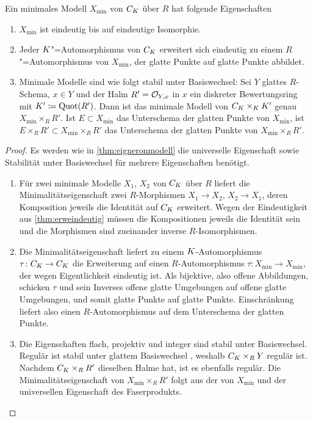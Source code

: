 \begin{Satz}\label{thm:eigminmodell}
  Ein minimales Modell $X_{\text{min}}$ von $C_{K}$ über $R$ hat
  folgende Eigenschaften
  \begin{enumerate}[label=(\alph*)]
  \item $X_{\text{min}}$ ist eindeutig bis auf eindeutige Isomorphie.
  \item{}
    Jeder $K$"=Automorphismus von $C_{K}$ erweitert sich eindeutig zu
    einem $R$"=Automorphismus von $X_{\text{min}}$, der glatte Punkte
    auf glatte Punkte abbildet.
  \item{}
    Minimale Modelle sind wie folgt stabil unter Basiswechsel:
    Sei $Y$ glattes $R$-Schema, ${x\in Y}$ und der Halm $R'=\mathcal{O}_{Y,x}$ in
    $x$  ein diskreter Bewertungsring mit $K'\coloneqq\operatorname{Quot}(R')$.
    Dann ist das minimale Modell von $C_{K}\times_{K}K'$ genau
    $X_{\text{min}}\times_R R'$.
    Ist $E\subset X_{\text{min}}$ das Unterschema der glatten Punkte
    von $X_{\text{min}}$, ist
    $E\times_R R'\subset X_{\text{min}}\times_R R'$ das Unterschema
    der glatten Punkte von $X_{\text{min}}\times_R R'$.
  \end{enumerate}
  \begin{proof}
    Es werden wie in \ref{thm:eigneronmodell} die universelle
    Eigenschaft sowie Stabilität unter Basiswechsel für mehrere
    Eigenschaften benötigt.
    \begin{enumerate}[resume*,start=1]
    \item Für zwei minimale Modelle $X_1$, $X_2$ von $C_{K}$ über $R$
      liefert die Minimalitätseigenschaft zwei $R$-Morphismen
      $X_1\to X_2$, $X_2\to X_1$, deren Komposition jeweils die
      Identität auf $C_{K}$ erweitert. Wegen der Eindeutigkeit aus
      \ref{thm:erweindeutig} müssen die Kompositionen jeweils die
      Identität sein und die Morphismen sind zueinander inverse
      $R$-Isomorphismen.
    \item Die Minimalitätseigenschaft liefert zu einem
      $K$-Automorphismus $\tau\colon C_{K}\to C_{K}$ die Erweiterung auf
      einen $R$-Automorphismus
      $\tau\colon X_{\text{min}}\to X_{\text{min}}$, der wegen
      Eigentlichkeit eindeutig ist.
      Als bijektive, also offene Abbildungen, schicken $\tau$ und
      sein Inverses offene glatte Umgebungen auf offene glatte
      Umgebungen, und somit glatte Punkte auf glatte
      Punkte. Einschränkung liefert also einen $R$-Automorphismus auf
      dem Unterschema der glatten Punkte.
    \item Die Eigenschaften flach, projektiv und integer sind stabil
      unter Basiswechsel. Regulär ist stabil unter glattem
      Basiswechsel \cite[Chapter~2.3, S.\,49]{neron}, weshalb
      $C_{K}\times_R Y$ regulär ist.
      Nachdem $C_{K}\times_R R'$ dieselben Halme hat, ist es ebenfalls
      regulär.
      Die Minimalitätseigenschaft von ${X_{\text{min}}\times_R R'}$
      folgt aus der von $X_{\text{min}}$ und der universellen
      Eigenschaft des Faserprodukts.
      

\end{enumerate}
\end{proof}
\end{Satz}
